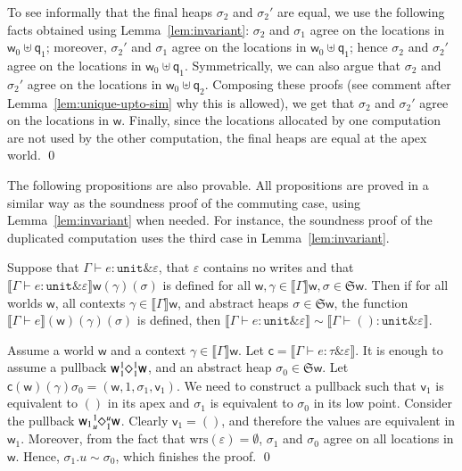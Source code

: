 \documentclass[orivec]{llncs}
\newif\iffull\fullfalse
\newcommand{\keywd}[1]{\mathtt{#1}}
\newcommand{\sq}[4]{\tensor*[^{#1}_{#2}]{\Diamond}{^{#3}_{#4}}}
\newcommand{\unittype}{\keywd{unit}}
\newcommand{\unitval}{\keywd{()}}
\newcommand{\wrsin}[1]{\mathrm{wrs}({#1})}
\newcommand{\eff}{\varepsilon}
\newcommand{\sem}[1]{\ensuremath{\llbracket {#1} \rrbracket}}
\renewenvironment{proof}{\vspace{-1mm} \noindent {\bf Proof}\quad}{\qed}
\newcommand\w{\ensuremath{\mathsf{w}}\xspace}
\newcommand\q{\ensuremath{\mathsf{q}}\xspace}
\newcommand{\Astores}{\mathfrak{S}}
\newcommand\val{\ensuremath{\mathsf{v}}\xspace}
\newcommand\cval{\ensuremath{\mathsf{c}}\xspace}
\newcommand{\ety}[2]{{#1}\mathrel{\&}{#2}}
\begin{document}
\begin{proof}
To see informally that the final heaps $\sigma_2$ and $\sigma_2'$ are
equal, we use
the following facts obtained using Lemma~\ref{lem:invariant}: $\sigma_2$
and $\sigma_1$ agree on the locations in $\w_0 \uplus \q_1$; moreover, 
$\sigma_2'$ and $\sigma_1$ agree on the locations in $\w_0 \uplus \q_1$; 
hence $\sigma_2$ and $\sigma_2'$ agree on the locations in $\w_0 \uplus
\q_1$. Symmetrically, we can also argue that $\sigma_2$ and $\sigma_2'$
agree on the locations in $\w_0 \uplus \q_2$. Composing these proofs 
(see comment after Lemma~\ref{lem:unique-upto-sim} why this is allowed), 
we get that $\sigma_2$ and $\sigma_2'$ agree on the locations in $\w$. 
Finally, since the locations allocated by one computation are not used by
the other computation, the final heaps are equal at the
apex world.
\end{proof}

The following propositions are also provable. All propositions are proved
in a similar way as the soundness proof of the commuting case, using 
Lemma~\ref{lem:invariant} when needed. For instance, the soundness proof
of the duplicated computation uses the third case in
Lemma~\ref{lem:invariant}.

\begin{proposition}\label{dead}
Suppose that
$\Gamma \vdash e : \ety{\unittype}{\eff}$,
that \iffull $\wrsin{\eff}=\emptyset$ \else 
$\eff$ contains no writes \fi and that $\sem{\Gamma\vdash
e: \ety{\unittype}{\eff}}\w(\gamma)(\sigma)$ is defined for all
$\w,\gamma\in\sem{\Gamma}\w, \sigma\in\Astores\w$. 
Then if for all worlds \w, all contexts $\gamma \in
\sem{\Gamma}\w$, and abstract heaps $\sigma \in \Astores\w$,
the function $\sem{\Gamma \vdash e}(\w)(\gamma)(\sigma)$ is defined, 
then $\sem{\Gamma \vdash e : \ety{\unittype}{\eff}} \sim \sem{\Gamma
\vdash \unitval : \ety{\unittype}{\eff}}$.
\end{proposition}

\begin{proof}
Assume a world \w and a context $\gamma \in \sem{\Gamma}\w$.
Let $\cval = \sem{\Gamma \vdash e : \ety{\tau}{\eff}}$. 
It is enough to assume a pullback 
$\w \sq{1}{1}{1}{1} \w$, and an abstract heap $\sigma_0 \in
\Astores \w$. Let $\cval(\w)(\gamma)\sigma_0  =  (\w, 1, \sigma_1,
\val_1)$. We need to construct a pullback such that $\val_1$ is equivalent
to $\unitval$ in its apex and $\sigma_1$ is equivalent to $\sigma_0$ in
its low point. Consider the pullback $\w_1 \sq{1}{u}{u}{1} \w$. Clearly
$\val_1 = \unitval$, and therefore the values are equivalent in $\w_1$.
Moreover, from the fact that $\wrsin{\eff} =
\emptyset$, $\sigma_1$ and $\sigma_0$ agree on all locations in $\w$.
Hence, $\sigma_1.u \sim \sigma_0$, which finishes the proof. 
\end{proof}
\end{document}
